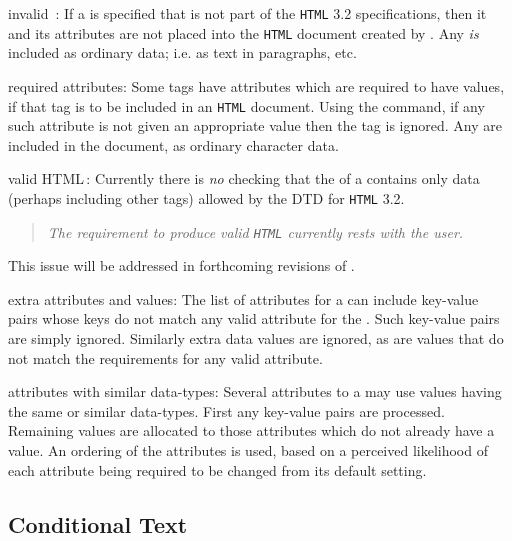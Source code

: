 \begin{htmllist}
%
\item [invalid \Meta{tag}\,: ]
If a  is specified that is not part of the 
\texttt{HTML} 3.2 specifications, then it and its attributes are 
not placed into the \texttt{HTML} document created by \latextohtml.
Any  \emph{is} included as ordinary data; 
i.e. as text in paragraphs, etc.

\item [required attributes: ] 
Some tags have attributes which are required to have values,
if that tag is to be included in an \texttt{HTML} document.
Using the  command, if any such attribute
is not given an appropriate value then the tag is ignored.
Any  are included in the document, 
as ordinary character data.

\item [valid HTML\,: ] 
Currently there is \emph{no} checking that the 
of a  contains only data (perhaps including other tags)
allowed by the DTD for \texttt{HTML} 3.2.
\begin{quote}
\textit{The requirement to produce valid \texttt{\upshape HTML} 
currently rests with the user.}
\end{quote}
This issue will be addressed in forthcoming revisions of \latextohtml.

\item [extra attributes and values: ]
The list of attributes for a  can include
key-value pairs whose keys do not match any valid
attribute for the .
Such key-value pairs are simply ignored.
Similarly extra data values are ignored, 
as are values that do not match the
requirements for any valid attribute.

\item [attributes with similar data-types: ]
Several attributes to a  may use values having 
the same or similar data-types. First any key-value pairs
are processed. Remaining values are allocated 
to those attributes which do not already have a value.
An ordering of the attributes is used, based on a perceived likelihood 
of each attribute being required to be changed from its default setting.

\end{htmllist}


\subsection{Conditional Text\label{sec:latexonly}}%
\tableofchildlinks*
{}%
%
%
%
\html{\\}%
